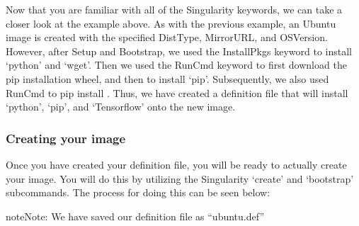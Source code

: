 \documentclass[letterpaper,10pt,english]{sphinxmanual}
\begin{document}
Now that you are familiar with all of the Singularity keywords, we can take a closer look at the example above. As with the previous example, an Ubuntu image is created with the specified DistType,
MirrorURL, and OSVersion. However, after Setup and Bootstrap, we used the InstallPkgs keyword to install ‘python’ and ‘wget’. Then we used the RunCmd keyword to first download the pip installation wheel,
and then to install ‘pip’. Subsequently, we also used RunCmd to pip install . Thus, we have created a definition file that will install ‘python’, ‘pip’, and ‘Tensorflow’ onto the new image.


\subsubsection{Creating your image}
\label{\detokenize{appendix:id1}}
Once you have created your definition file, you will be ready to actually create your image. You will do this by utilizing the Singularity ‘create’ and ‘bootstrap’ subcommands. The process for doing this
can be seen below:

\begin{sphinxadmonition}{note}{Note:}
We have saved our definition file as “ubuntu.def”
\end{sphinxadmonition}
\end{document}
